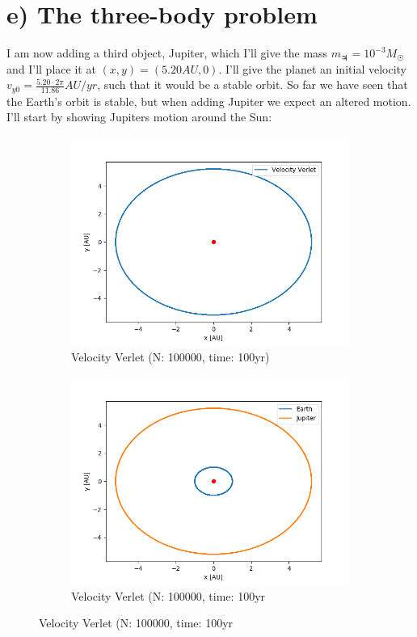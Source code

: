 \documentclass{article}
\begin{document}
\section*{e) The three-body problem}
I am now adding a third object, Jupiter, which I'll give the mass $m_{\Jupiter} = 10^{-3}M_{\Sun}$ and I'll place it at $(x,y)=(5.20AU,0)$. I'll give the planet an initial velocity $v_{y0} =\frac{5.20\cdot2\pi}{11.86}AU/yr$, such that it would be a stable orbit. So far we have seen that the Earth's orbit is stable, but when adding Jupiter we expect an altered motion.
I'll start by showing Jupiters motion around the Sun:
\begin{figure}[H]
  \centering
  \begin{subfigure}{0.5\textwidth}
    \centering
    \includegraphics[width=1.0\textwidth]{plots/jupiter.png}
    \caption{Velocity Verlet (N: 100000, time: 100yr)}
  \end{subfigure}%
    \begin{subfigure}{0.5\textwidth}
    \centering
    \includegraphics[width=1.0\textwidth]{plots/jupiter_m0p001.png}
    \caption{Velocity Verlet (N: 100000, time: 100yr}  
  \end{subfigure}
\end{figure}
\end{document}
